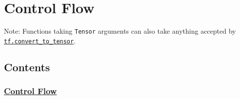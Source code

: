 

\section{Control Flow }\label{control-flow}

Note: Functions taking \texttt{Tensor} arguments can also take anything
accepted by
\href{../../api_docs/python/framework.md\#convert_to_tensor}{\texttt{tf.convert\_to\_tensor}}.

\subsection{Contents}\label{contents}

\subsubsection{\texorpdfstring{\protect\hyperlink{AUTOGENERATED-control-flow}{Control
Flow}}{Control Flow}}\label{control-flow-1}

